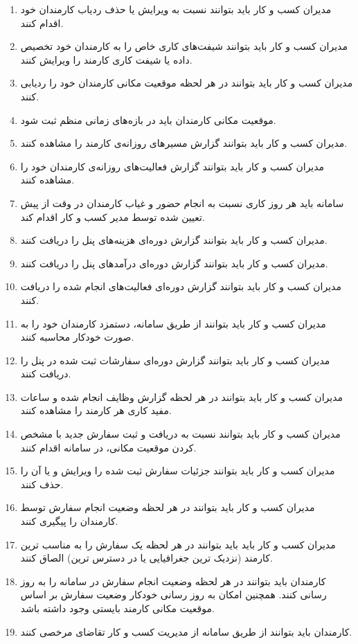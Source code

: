\begin{enumerate}
\item مدیران کسب و کار باید بتوانند نسبت به ویرایش یا حذف ردیاب کارمندان  خود اقدام کنند.
\item مدیران کسب و کار باید بتوانند شیفت‌های کاری خاص را به کارمندان خود تخصیص داده یا شیفت کاری کارمند را ویرایش کنند.
\item مدیران کسب و کار باید بتوانند در هر لحظه موقعیت مکانی کارمندان خود را ردیابی کنند.
\item موقعیت مکانی کارمندان باید در بازه‌های زمانی منظم ثبت شود.
\item مدیران کسب و کار باید بتوانند گزارش مسیر‌های روزانه‌ی کارمند را مشاهده کنند.
\item مدیران کسب و کار باید بتوانند گزارش فعالیت‌های روزانه‌ی کارمندان خود را مشاهده کنند.
\item سامانه باید هر روز کاری نسبت به انجام حضور و غیاب کارمندان در وقت از پیش تعیین شده توسط مدیر کسب و کار اقدام کند.
\item مدیران کسب و کار باید بتوانند گزارش دوره‌ای هزینه‌های پنل را دریافت کنند.
\item مدیران کسب و کار باید بتوانند گزارش دوره‌ای درآمد‌های پنل را دریافت کنند.
\item مدیران کسب و کار باید بتوانند گزارش دوره‌ای فعالیت‌های انجام شده را دریافت کنند.
\item مدیران کسب و کار باید بتوانند از طریق سامانه، دستمزد کارمندان خود را به صورت خودکار محاسبه کنند.
\item مدیران کسب و کار باید بتوانند گزارش دوره‌ای سفارشات ثبت شده در پنل را دریافت کنند.
\item مدیران کسب و کار باید بتوانند در هر لحظه گزارش وظایف انجام شده و ساعات مفید کاری هر کارمند را مشاهده کنند.
\item مدیران کسب و کار باید بتوانند نسبت به دریافت و ثبت سفارش جدید با مشخص کردن موقعیت مکانی، در سامانه اقدام کنند.
\item مدیران کسب و کار باید بتوانند جزئیات سفارش ثبت شده را ویرایش و یا آن را حذف کنند.
\item مدیران کسب و کار باید بتوانند در هر لحظه وضعیت انجام سفارش توسط کارمندان را پیگیری کنند.
\item مدیران کسب و کار باید باید بتوانند در هر لحظه یک سفارش را به  مناسب ترین کارمند (نزدیک ترین جغرافیایی یا در دسترس ترین) الصاق کنند.
\item کارمندان باید بتوانند در هر لحظه وضعیت انجام سفارش در سامانه را به روز رسانی کنند. همچنین امکان به روز رسانی خودکار وضعیت سفارش بر اساس موقعیت مکانی کارمند بایستی وجود داشته باشد.
\item کارمندان باید بتوانند از طریق سامانه از مدیریت کسب و کار تقاضای مرخصی کنند.

\end{enumerate}
